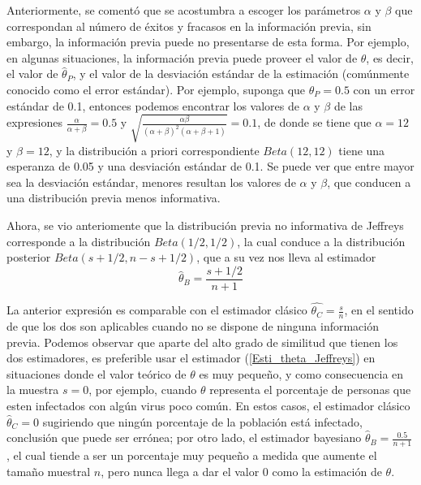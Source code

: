     Anteriormente, se coment\'o que se acostumbra a escoger los par\'ametros $\alpha$ y $\beta$ que correspondan al n\'umero de \'exitos y fracasos en la informaci\'on previa, sin embargo, la informaci\'on previa puede no presentarse de esta forma. Por ejemplo, en algunas situaciones, la informaci\'on previa puede proveer el valor de $\theta$, es decir, el valor de $\hat{\theta}_P$, y el valor de la desviaci\'on est\'andar de la estimaci\'on (com\'unmente conocido como el error est\'andar). Por ejemplo, suponga que $\hat{\theta}_P=0.5$ con un error est\'andar de 0.1, entonces podemos encontrar los valores de $\alpha$ y $\beta$ de las expresiones $\frac{\alpha}{\alpha+\beta}=0.5$ y $\sqrt{\frac{\alpha\beta}{(\alpha+\beta)^2(\alpha+\beta+1)}}=0.1$, de donde se tiene que $\alpha=12$ y $\beta=12$, y la distribuci\'on a priori correspondiente $Beta(12,12)$ tiene una esperanza de 0.05 y una desviaci\'on est\'andar de 0.1. Se puede ver que entre mayor sea la desviaci\'on est\'andar, menores resultan los valores de $\alpha$ y $\beta$, que conducen a una distribuci\'on previa menos informativa.
    
    Ahora, se vio anteriomente que la distribuci\'on previa no informativa de Jeffreys corresponde a la distribuci\'on $Beta(1/2,1/2)$, la cual conduce a la distribuci\'on posterior $Beta(s+1/2,n-s+1/2)$, que a su vez nos lleva al estimador 
    \begin{equation}
    \label{Esti_theta_Jeffreys}
    \hat{\theta}_B=\frac{s+1/2}{n+1}
    \end{equation}
    
    La anterior expresi\'on es comparable con el estimador cl\'asico $\hat{\theta_C}=\frac{s}{n}$, en el sentido de que los dos son aplicables cuando no se dispone de ninguna informaci\'on previa. Podemos observar que aparte del alto grado de similitud que tienen los dos estimadores, es preferible usar el estimador (\ref{Esti_theta_Jeffreys}) en situaciones donde el valor te\'orico de $\theta$ es muy peque\~no, y como consecuencia en la muestra $s=0$, por ejemplo, cuando $\theta$ representa el porcentaje de personas que esten infectados con alg\'un virus poco com\'un. En estos casos, el estimador cl\'asico $\hat{\theta}_C=0$ sugiriendo que ning\'un porcentaje de la poblaci\'on est\'a infectado, conclusi\'on que puede ser err\'onea; por otro lado, el estimador bayesiano $\hat{\theta}_B=\frac{0.5}{n+1}$, el cual tiende a ser un porcentaje muy peque\~no a medida que aumente el tama\~no muestral $n$, pero nunca llega a dar el valor 0 como la estimaci\'on de $\theta$.
    
